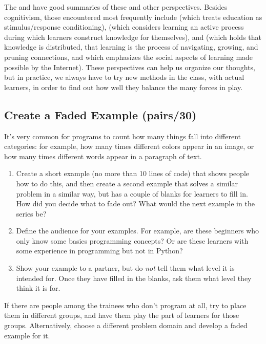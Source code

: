 The  and \cite{Wibu2016}
have good summaries of these and other perspectives.
Besides cognitivism,
those encountered most frequently include 
(which treats education as stimulus/response conditioning),
(which considers learning an active process during which learners construct knowledge for themselves),
and 
(which holds that knowledge is distributed,
that learning is the process of navigating, growing, and pruning connections,
and which emphasizes the social aspects of learning made possible by the Internet).
These perspectives can help us organize our thoughts,
but in practice,
we always have to try new methods in the class,
with actual learners,
in order to find out how well they balance the many forces in play.


\subsection*{Create a Faded Example (pairs/30)}

It's very common for programs to count how many things fall into
different categories: for example, how many times different colors
appear in an image, or how many times different words appear in a
paragraph of text.

\begin{enumerate}
\item
  Create a short example (no more than 10 lines of code) that shows
  people how to do this, and then create a second example that solves
  a similar problem in a similar way, but has a couple of blanks for
  learners to fill in. How did you decide what to fade out? What would
  the next example in the series be?
\item
  Define the audience for your examples. For example, are these
  beginners who only know some basics programming concepts? Or are
  these learners with some experience in programming but not in
  Python?
\item
  Show your example to a partner, but do \emph{not} tell them what level it
  is intended for. Once they have filled in the blanks, ask them what
  level they think it is for.
\end{enumerate}

If there are people among the trainees who don't program at all, try to
place them in different groups, and have them play the part of learners
for those groups. Alternatively, choose a different problem domain and
develop a faded example for it.

